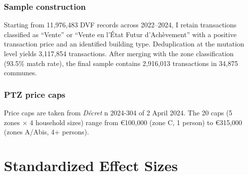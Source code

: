 \documentclass[12pt]{article}
\begin{document}
\subsubsection*{Sample construction} Starting from 11,976,483 DVF records across 2022--2024, I retain transactions classified as ``Vente'' or ``Vente en l'\'{E}tat Futur d'Ach\`{e}vement'' with a positive transaction price and an identified building type. Deduplication at the mutation level yields 3,117,854 transactions. After merging with the zone classification (93.5\% match rate), the final sample contains 2,916,013 transactions in 34,875 communes.

\subsubsection*{PTZ price caps} Price caps are taken from \textit{D\'{e}cret} n\textdegree{} 2024-304 of 2 April 2024. The 20 caps (5 zones $\times$ 4 household sizes) range from \euro100,000 (zone C, 1 person) to \euro315,000 (zones A/Abis, 4+ persons).

\section{Standardized Effect Sizes}
\label{sec:sde}


\end{document}
